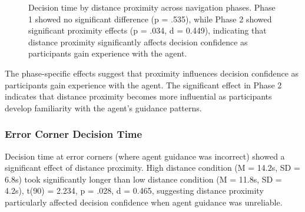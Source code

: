 \documentclass[12pt]{article}
\begin{document}
\begin{figure}[h]
\centering
{}
\caption{Decision time by distance proximity across navigation phases. Phase 1 showed no significant difference (p = .535), while Phase 2 showed significant proximity effects (p = .034, d = 0.449), indicating that distance proximity significantly affects decision confidence as participants gain experience with the agent.}
\label{fig:decision_time}
\end{figure}

The phase-specific effects suggest that proximity influences decision confidence as participants gain experience with the agent. The significant effect in Phase 2 indicates that distance proximity becomes more influential as participants develop familiarity with the agent's guidance patterns.

\subsubsection{Error Corner Decision Time}

Decision time at error corners (where agent guidance was incorrect) showed a significant effect of distance proximity. High distance condition (M = 14.2s, SD = 6.8s) took significantly longer than low distance condition (M = 11.8s, SD = 4.2s), t(90) = 2.234, p = .028, d = 0.465, suggesting distance proximity particularly affected decision confidence when agent guidance was unreliable.
\end{document}
